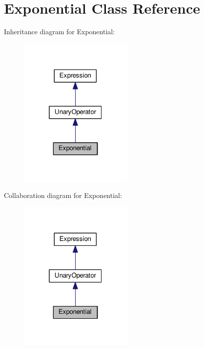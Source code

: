 \hypertarget{classExponential}{}\section{Exponential Class Reference}
\label{classExponential}


Inheritance diagram for Exponential\+:\nopagebreak
\begin{figure}[H]
\begin{center}
\leavevmode
\includegraphics[width=160pt]{classExponential__inherit__graph}
\end{center}
\end{figure}


Collaboration diagram for Exponential\+:\nopagebreak
\begin{figure}[H]
\begin{center}
\leavevmode
\includegraphics[width=160pt]{classExponential__coll__graph}
\end{center}
\end{figure}
